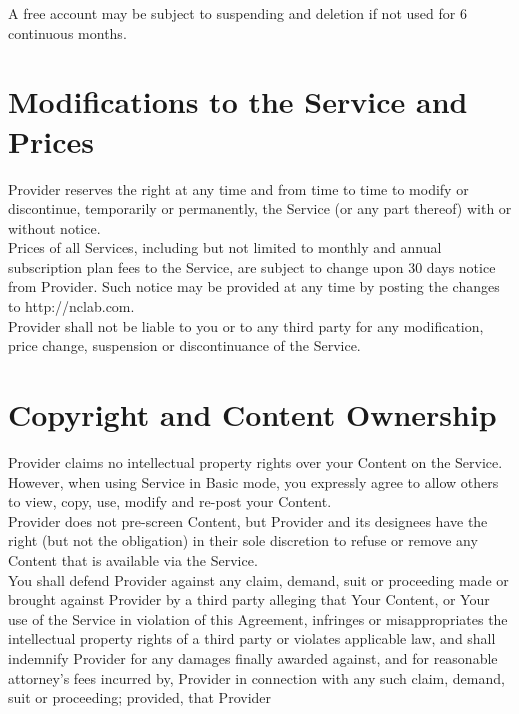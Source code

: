 \documentclass{article}
\begin{document}
\noindent
A free account may be subject to suspending and deletion if not used for 6 continuous months. \\

\section*{Modifications to the Service and Prices}

Provider reserves the right at any time and from time to time to modify or discontinue, temporarily or permanently, the Service (or any part thereof) with or without notice.\\

\noindent
Prices of all Services, including but not limited to monthly and annual subscription plan fees to the Service, are subject to change upon 30 days notice from Provider. Such notice may be provided at any time by posting the changes to http://nclab.com.\\

\noindent
Provider shall not be liable to you or to any third party for any modification, price change, suspension or discontinuance of the Service.


\section*{Copyright and Content Ownership}

Provider claims no intellectual property rights over your Content on the Service. However, when using Service in Basic mode, you expressly agree to allow others to view, copy, use, modify and re-post your Content. \\

\noindent
Provider does not pre-screen Content, but Provider and its designees have the right (but not the obligation) in their sole discretion to refuse or remove any Content that is available via the Service.\\

\noindent
You shall defend Provider against any claim, demand, suit or proceeding made or brought against Provider by a third party alleging that Your Content, or Your use of the Service in violation of this Agreement, infringes or misappropriates the intellectual property rights of a third party or violates applicable law, and shall indemnify Provider for any damages finally awarded against, and for reasonable attorney’s fees incurred by, Provider in connection with any such claim, demand, suit or proceeding; provided, that Provider 
\end{document}
